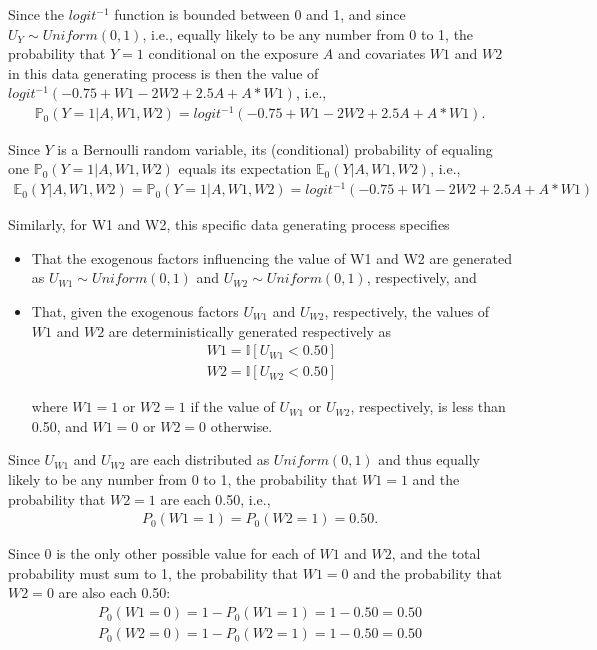 \documentclass{article}\usepackage[]{graphicx}\usepackage[]{xcolor}
\begin{document}
Since the $logit^{-1}$ function is bounded between 0 and 1, and since $U_Y \sim Uniform(0,1)$, i.e., equally likely to be any number from 0 to 1, the probability that $Y=1$ conditional on the exposure $A$ and covariates $W1$ and $W2$ in this data generating process is then the value of $logit^{-1}(-0.75+W1-2W2+2.5A+A*W1)$, i.e., 
\begin{align*}
\mathbb{P}_0(Y=1|A,W1,W2)=logit^{-1}(-0.75+W1-2W2+2.5A+A*W1).
\end{align*}
  
Since $Y$ is a Bernoulli random variable, its (conditional) probability of equaling one $\mathbb{P}_0(Y=1|A,W1,W2)$ equals its expectation $\mathbb{E}_0(Y|A,W1,W2)$, i.e.,
\begin{align*}
\mathbb{E}_0(Y|A,W1,W2)=\mathbb{P}_0(Y=1|A,W1,W2)=logit^{-1}(-0.75+W1-2W2+2.5A+A*W1)
\end{align*}

Similarly, for W1 and W2, this specific data generating process specifies 
\begin{itemize}

\item That the exogenous factors influencing the value of W1 and W2 are generated as $U_{W1} \sim Uniform(0,1)$ and $U_{W2} \sim Uniform(0,1)$, respectively, and

\item That, given the exogenous factors $U_{W1}$ and $U_{W2}$, respectively, the values of $W1$ and $W2$ are deterministically generated respectively as 
\begin{align*}
W1=\mathbb{I}[U_{W1}<0.50] \\
W2=\mathbb{I}[U_{W2}<0.50]
\end{align*}

where $W1=1$ or $W2=1$ if the value of $U_{W1}$ or $U_{W2}$, respectively, is less than 0.50, and $W1=0$ or $W2=0$ otherwise.  

\end{itemize}

Since $U_{W1}$ and $U_{W2}$ are each distributed as $Uniform(0,1)$ and thus equally likely to be any number from 0 to 1, the probability that $W1=1$ and the probability that $W2=1$ are each 0.50, i.e., 
\begin{align*}
P_0(W1=1)=P_0(W2=1)=0.50.
\end{align*}

Since 0 is the only other possible value for each of $W1$ and $W2$, and the total probability must sum to 1, the probability that $W1=0$ and the probability that $W2=0$ are also each 0.50:
\begin{align*}
P_0(W1=0)=1-P_0(W1=1)=1-0.50=0.50 \\
P_0(W2=0)=1-P_0(W2=1)=1-0.50=0.50
\end{align*}
\end{document}
